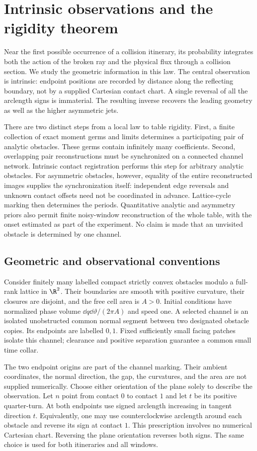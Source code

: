 \section{Intrinsic observations and the rigidity theorem}
\label{sec:introduction}
Near the first possible occurrence of a collision itinerary, its
probability integrates both the action of the broken ray and the physical
flux through a collision section. We study the geometric information in
this law. The central observation is intrinsic: endpoint positions are
recorded by distance along the reflecting boundary, not by a supplied
Cartesian contact chart. A single reversal of all the arclength signs
is immaterial. The resulting inverse recovers the leading geometry as
well as the higher asymmetric jets.

There are two distinct steps from a local law to table rigidity.
First, a finite collection of exact moment germs and limits determines
a participating pair of analytic obstacles. These germs contain
infinitely many coefficients. Second, overlapping pair reconstructions
must be synchronized on a connected channel network. Intrinsic contact
registration performs this step for arbitrary analytic obstacles.
For asymmetric obstacles, however, equality of the entire reconstructed
images supplies the synchronization itself: independent edge reversals
and unknown contact offsets need not be coordinated in advance.
Lattice-cycle marking then determines the periods. Quantitative analytic
and asymmetry priors also permit finite noisy-window reconstruction of
the whole table, with the onset estimated as part of the experiment.
No claim is made that an unvisited obstacle is determined by one channel.

\subsection{Geometric and observational conventions}
Consider finitely many labelled compact strictly convex obstacles modulo
a full-rank lattice in $\R^2$. Their boundaries are smooth with positive
curvature, their closures are disjoint, and the free cell area is $A>0$.
Initial conditions have normalized phase volume
$\dd q\dd\vartheta/(2\pi A)$ and speed one. A selected channel is an
isolated unobstructed common normal segment between two designated
obstacle copies. Its endpoints are labelled $0,1$. Fixed sufficiently
small facing patches isolate this channel; clearance and positive
separation guarantee a common small time collar.

The two endpoint origins are part of the channel marking. Their ambient
coordinates, the normal direction, the gap, the curvatures, and the area
are not supplied numerically. Choose either orientation of the plane
solely to describe the observation. Let $n$ point from contact $0$ to
contact $1$ and let $t$ be its positive quarter-turn. At both endpoints
use signed arclength increasing in tangent direction $t$. Equivalently,
one may use counterclockwise arclength around each obstacle and reverse
its sign at contact $1$. This prescription involves no numerical
Cartesian chart. Reversing the plane orientation reverses both signs.
The same choice is used for both itineraries and all windows.

